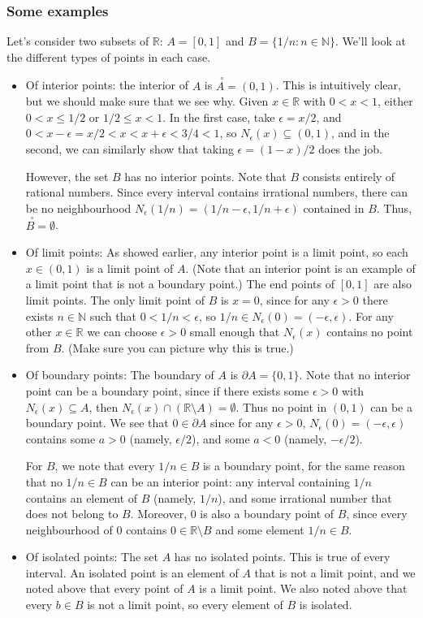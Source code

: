 \documentclass[12pt,letterpaper]{article}
\newcommand{\R}{\mathbb{R}}
\newcommand{\inter}[1]{\overset{\,\,\,\circ}{#1}}
\newcommand{\N}{\mathbb{N}}
\begin{document}
\subsubsection*{Some examples}
Let's consider two subsets of $\R$: $A=[0,1]$ and $B=\{1/n:n\in\N\}$. We'll look at the different types of points in each case.
\begin{itemize}
 \item Of interior points: the interior of $A$ is $\inter{A} = (0,1)$. This is intuitively clear, but we should make sure that we see why. Given $x\in \R$ with $0<x<1$, either $0<x\leq 1/2$ or $1/2\leq x<1$. In the first case, take $\epsilon = x/2$, and $0<x-\epsilon = x/2<x<x+\epsilon<3/4<1$, so $N_\epsilon(x)\subseteq (0,1)$, and in the second, we can similarly show that taking $\epsilon = (1-x)/2$ does the job.

 However, the set $B$ has no interior points. Note that $B$ consists entirely of rational numbers. Since every interval contains irrational numbers, there can be no neighbourhood $N_\epsilon(1/n) = (1/n-\epsilon,1/n+\epsilon)$ contained in $B$. Thus, $\inter{B} = \emptyset$.
 \item Of limit points: As showed earlier, any interior point is a limit point, so each $x\in (0,1)$ is a limit point of $A$. (Note that an interior point is an example of a limit point that is not a boundary point.) The end points of $[0,1]$ are also limit points. The only limit point of $B$ is $x=0$, since for any $\epsilon>0$ there exists $n\in\N$ such that $0<1/n<\epsilon$, so $1/n\in N_\epsilon(0) = (-\epsilon,\epsilon)$. For any other $x\in \R$ we can choose $\epsilon>0$ small enough that $N_\epsilon(x)$ contains no point from $B$. (Make sure you can picture why this is true.)
 \item Of boundary points: The boundary of $A$ is $\partial A = \{0,1\}$. Note that no interior point can be a boundary point, since if there exists some $\epsilon>0$ with $N_\epsilon(x)\subseteq A$, then $N_\epsilon(x)\cap (\R\setminus A) = \emptyset$. Thus no point in $(0,1)$ can be a boundary point. We see that $0\in \partial A$ since for any $\epsilon>0$, $N_\epsilon(0) = (-\epsilon,\epsilon)$ contains some $a>0$ (namely, $\epsilon/2$), and some $a<0$ (namely, $-\epsilon/2$).

 For $B$, we note that every $1/n\in B$ is a boundary point, for the same reason that no $1/n\in B$ can be an interior point: any interval containing $1/n$ contains an element of $B$ (namely, $1/n$), and some irrational number that does not belong to $B$. Moreover, 0 is also a boundary point of $B$, since every neighbourhood of 0 contains $0\in \R\setminus B$ and some element $1/n\in B$.
 \item Of isolated points: The set $A$ has no isolated points. This is true of every interval. An isolated point is an element of $A$ that is not a limit point, and we noted above that every point of $A$ is a limit point. We also noted above that every $b\in B$ is not a limit point, so every element of $B$ is isolated.
\end{itemize}
\end{document}
